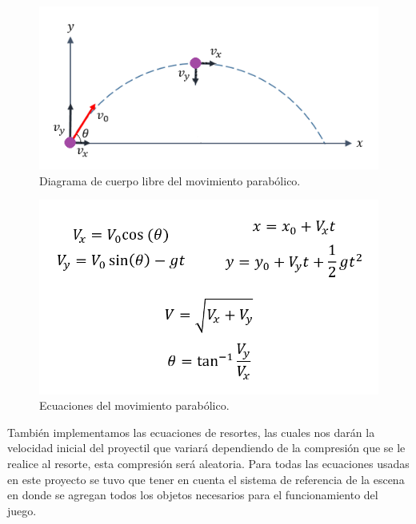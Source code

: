 \documentclass{article}
\begin{document}
\begin{figure}[h]
\includegraphics[scale=1]{Images/diagramaparabolico.png}
\centering
\caption{Diagrama de cuerpo libre del movimiento parabólico.}
\label{fig:diagramaparabolico}
\end{figure}

\begin{figure}[h]
\includegraphics[scale=0.5]{Images/ecuacionparabolica.png}
\centering
\caption{Ecuaciones del movimiento parabólico.}
\label{fig:ecuacionesmovpara}
\end{figure}

También implementamos las ecuaciones de resortes, las cuales nos darán la velocidad inicial del proyectil que variará dependiendo de la compresión que se le realice al resorte, esta compresión será aleatoria. Para todas las ecuaciones usadas en este proyecto se tuvo que tener en cuenta el sistema de referencia de la escena en donde se agregan todos los objetos necesarios para el funcionamiento del juego.
\end{document}
